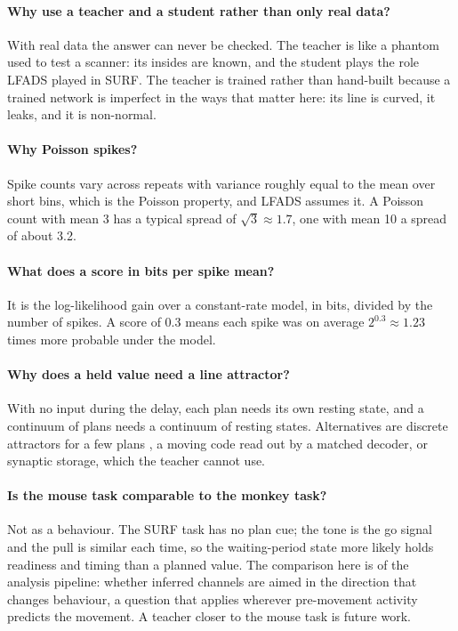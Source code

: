 \documentclass[11pt,a4paper]{article}
\begin{document}
\paragraph{Why use a teacher and a student rather than only real data?} With real data the answer can never be checked. The teacher is like a phantom used to test a scanner: its insides are known, and the student plays the role LFADS played in SURF. The teacher is trained rather than hand-built because a trained network is imperfect in the ways that matter here: its line is curved, it leaks, and it is non-normal.

\paragraph{Why Poisson spikes?} Spike counts vary across repeats with variance roughly equal to the mean over short bins, which is the Poisson property, and LFADS assumes it. A Poisson count with mean 3 has a typical spread of $\sqrt3\approx1.7$, one with mean 10 a spread of about 3.2.

\paragraph{What does a score in bits per spike mean?} It is the log-likelihood gain over a constant-rate model, in bits, divided by the number of spikes. A score of 0.3 means each spike was on average $2^{0.3}\approx1.23$ times more probable under the model.

\paragraph{Why does a held value need a line attractor?} With no input during the delay, each plan needs its own resting state, and a continuum of plans needs a continuum of resting states. Alternatives are discrete attractors for a few plans \citep{inagaki2019}, a moving code read out by a matched decoder, or synaptic storage, which the teacher cannot use.

\paragraph{Is the mouse task comparable to the monkey task?} Not as a behaviour. The SURF task has no plan cue; the tone is the go signal and the pull is similar each time, so the waiting-period state more likely holds readiness and timing than a planned value. The comparison here is of the analysis pipeline: whether inferred channels are aimed in the direction that changes behaviour, a question that applies wherever pre-movement activity predicts the movement. A teacher closer to the mouse task is future work.
\end{document}
